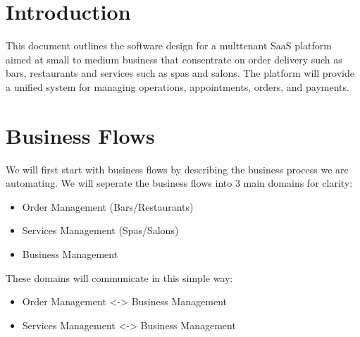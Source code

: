\documentclass[]{VUMIFTemplateClass}
\begin{document}



\section*{Introduction}
This document outlines the software design for a multtenant SaaS platform
aimed at small to medium business that consentrate on order delivery such as
bars, restaurants and services such as spas and salons. The platform will
provide a unified system for managing operations, appointments, orders, and
payments.








\section{Business Flows}

We will first start with business flows by describing the business process we are automating. We will
seperate the business flows into 3 main domains for clarity:
\begin{itemize}
    \item Order Management (Bars/Restaurants)
    \item Services Management (Spas/Salons)
    \item Business Management
\end{itemize}
These domains will communicate in this simple way:
\begin{itemize}
    \item Order Management <-> Business Management
    \item Services Management <-> Business Management
\end{itemize}
\end{document}

